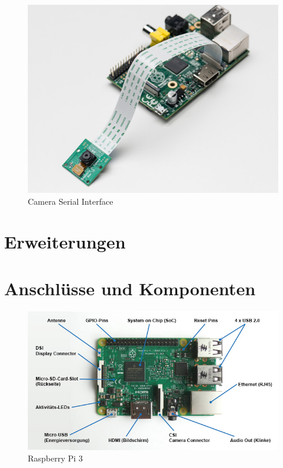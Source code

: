 \documentclass[12pt,a4paper]{article}
\begin{document}
\begin{figure}[H]
\centering
\includegraphics[scale=.8]{csi}
\caption{Camera Serial Interface}
\label{fig:gpio}
\end{figure}


\section{Erweiterungen}


\clearpage
\appendix
\makeatletter
\def\@seccntformat#1{Anhang~\csname the#1\endcsname:\quad}
\makeatother

\section{Anschlüsse und Komponenten}
\label{apx:comp}

\begin{figure}[h]
\centering
\includegraphics[scale=0.7]{raspberry_loesung}
\caption{Raspberry Pi 3}
\label{fig:rp_ls}
\end{figure}
\end{document}
